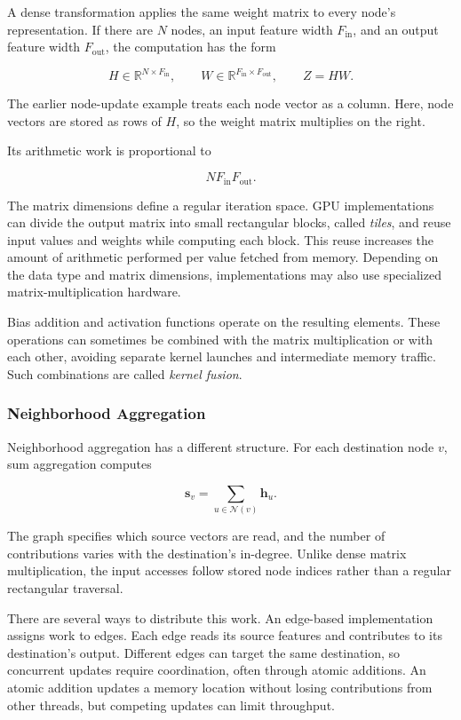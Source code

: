 A dense transformation applies the same weight matrix to every node's representation. If there are $N$ nodes, an input feature width $F_{\mathrm{in}}$, and an output feature width $F_{\mathrm{out}}$, the computation has the form

\[
  H\in\mathbb{R}^{N\times F_{\mathrm{in}}},
  \qquad
  W\in\mathbb{R}^{F_{\mathrm{in}}\times F_{\mathrm{out}}},
  \qquad
  Z=HW.
\]

The earlier node-update example treats each node vector as a column. Here, node vectors are stored as rows of $H$, so the weight matrix multiplies on the right.

Its arithmetic work is proportional to

\[
  NF_{\mathrm{in}}F_{\mathrm{out}}.
\]

The matrix dimensions define a regular iteration space. GPU implementations can divide the output matrix into small rectangular blocks, called \emph{tiles}, and reuse input values and weights while computing each block. This reuse increases the amount of arithmetic performed per value fetched from memory. Depending on the data type and matrix dimensions, implementations may also use specialized matrix-multiplication hardware.

Bias addition and activation functions operate on the resulting elements. These operations can sometimes be combined with the matrix multiplication or with each other, avoiding separate kernel launches and intermediate memory traffic. Such combinations are called \emph{kernel fusion}.

\subsubsection{Neighborhood Aggregation}

Neighborhood aggregation has a different structure. For each destination node $v$, sum aggregation computes

\[
  \mathbf{s}_v=\sum_{u\in\mathcal{N}(v)}\mathbf{h}_u.
\]

The graph specifies which source vectors are read, and the number of contributions varies with the destination's in-degree. Unlike dense matrix multiplication, the input accesses follow stored node indices rather than a regular rectangular traversal.

There are several ways to distribute this work. An edge-based implementation assigns work to edges. Each edge reads its source features and contributes to its destination's output. Different edges can target the same destination, so concurrent updates require coordination, often through atomic additions. An atomic addition updates a memory location without losing contributions from other threads, but competing updates can limit throughput.

